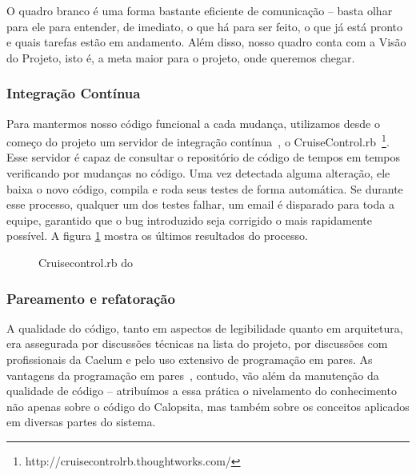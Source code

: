 O quadro branco é uma forma bastante eficiente de comunicação -- basta olhar para ele para entender, de imediato, o que há para ser feito, o que já está pronto e quais tarefas estão em andamento. Além disso, nosso quadro conta com a Visão do Projeto, isto é, a meta maior para o projeto, onde queremos chegar.

\subsubsection*{Integração Contínua}

Para mantermos nosso código funcional a cada mudança, utilizamos desde o começo do projeto um servidor de integração contínua~\cite{ci}, o CruiseControl.rb~\footnote{http://cruisecontrolrb.thoughtworks.com/}. Esse servidor é capaz de consultar o repositório de código de tempos em tempos verificando por mudanças no código. Uma vez detectada alguma alteração, ele baixa o novo código, compila e roda seus testes de forma automática. Se durante esse processo, qualquer um dos testes falhar, um email é disparado para toda a equipe, garantido que o bug introduzido seja corrigido o mais rapidamente possível. A figura \ref{figura:cruisecontrol} mostra os últimos resultados do processo.

\begin{figure}[H]
  \label{figura:cruisecontrol}
  \centering
  \caption{Cruisecontrol.rb do \calopsita{}}
\end{figure}

\subsubsection*{Pareamento e refatoração}

A qualidade do código, tanto em aspectos de legibilidade quanto em arquitetura, era assegurada por discussões técnicas na lista do projeto, por discussões com profissionais da Caelum e pelo uso extensivo de programação em pares. As vantagens da programação em pares~\cite{pair}, contudo, vão além da manutenção da qualidade de código -- atribuímos a essa prática o nivelamento do conhecimento não apenas sobre o código do Calopsita, mas também sobre os conceitos aplicados em diversas partes do sistema.

